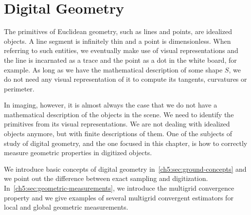 \chapter{Digital Geometry}
\label{chapter:digital-geometry}

The primitives of Euclidean geometry, such as lines and points, are idealized objects. A line segment is infinitely thin and a point is dimensionless. When referring to such entities, we eventually make use of visual representations and the line is incarnated as a trace and the point as a dot in the white board, for example. As long as we have the mathematical description of some shape $S$, we do not need any visual representation of it to compute its tangents, curvatures or perimeter. 

In imaging, however, it is almost always the case that we do not have a mathematical description of the objects in the scene. We need to identify the primitives from its visual representations.  We are not dealing with idealized objects anymore, but with finite descriptions of them. One of the subjects of study of digital geometry, and the one focused in this chapter, is how to correctly measure geometric properties in digitized objects.

We introduce basic concepts of digital geometry in~\cref{ch5:sec:ground-concepts} and we point out the difference between exact sampling and digitization. In~\cref{ch5:sec:geometric-measurements}, we introduce the multigrid convergence property and we give examples of several multigrid convergent estimators for local and global geometric measurements.

%


